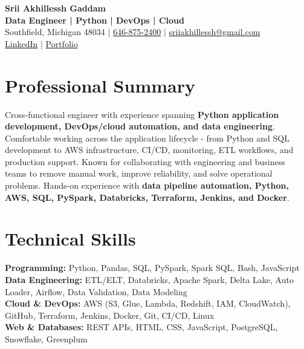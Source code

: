 \documentclass[letterpaper,10pt]{article}
\begin{document}
\fontsize{9.35pt}{10.45pt}\selectfont

\begin{center}
    {\LARGE \textbf{Srii Akhillessh Gaddam}} \\[-1pt]
    \textbf{Data Engineer | Python | DevOps | Cloud} \\[2pt]
    Southfield, Michigan 48034 $|$
    \href{tel:6468752400}{646-875-2400} $|$
    \href{mailto:sriiakhillessh@gmail.com}{sriiakhillessh@gmail.com} \\[1pt]
    \href{https://www.linkedin.com/in/srii-akhiilessh-gaddam-b48668191/}{LinkedIn} $|$
    \href{https://sriiakhillesshg.github.io/portfolio/}{Portfolio}
\end{center}
\vspace{-8pt}

\section{Professional Summary}
\small{Cross-functional engineer with experience spanning \textbf{Python application development, DevOps/cloud automation, and data engineering}. Comfortable working across the application lifecycle - from Python and SQL development to AWS infrastructure, CI/CD, monitoring, ETL workflows, and production support. Known for collaborating with engineering and business teams to remove manual work, improve reliability, and solve operational problems. Hands-on experience with \textbf{data pipeline automation, Python, AWS, SQL, PySpark, Databricks, Terraform, Jenkins, and Docker}.}

\section{Technical Skills}
\small{
\textbf{Programming:} Python, Pandas, SQL, PySpark, Spark SQL, Bash, JavaScript \\
\textbf{Data Engineering:} ETL/ELT, Databricks, Apache Spark, Delta Lake, Auto Loader, Airflow, Data Validation, Data Modeling \\
\textbf{Cloud \& DevOps:} AWS (S3, Glue, Lambda, Redshift, IAM, CloudWatch), GitHub, Terraform, Jenkins, Docker, Git, CI/CD, Linux \\
\textbf{Web \& Databases:} REST APIs, HTML, CSS, JavaScript, PostgreSQL, Snowflake, Greenplum
}

\end{document}
